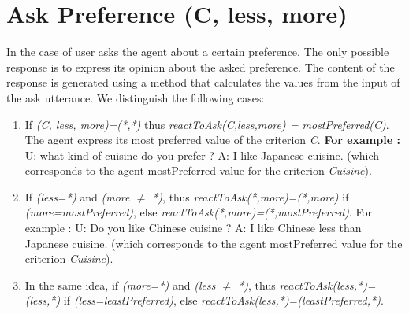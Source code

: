 \documentclass{llncs}
\begin{document}
\section{Ask Preference (C, less, more)}
	\par In the case of user asks the agent about a certain preference. The only possible response is to express its opinion about the asked preference.  The content of the response is generated using a method that calculates the values from the input of the ask utterance. We distinguish the following cases:
		\begin{enumerate}
			\item If \textit{(C, less, more)=(*,*)} thus \textit{reactToAsk(C,less,more) = mostPreferred(C)}. The agent express its most preferred value of the criterion \emph{C}.
				\subitem \textbf{For example :} 
				\subitem U: what kind of cuisine do you prefer ?
				\subitem A: I like Japanese cuisine. (which corresponds to the agent mostPreferred value for the criterion \textit{Cuisine}).
 
			\item  If \textit{(less=*)} and \textit{(more $\not =$ *)}, thus \textit{reactToAsk(*,more)=(*,more) } if \textit{(more=mostPreferred)}, else \textit{reactToAsk(*,more)=(*,mostPreferred)}.
			\subitem For example : 
				\subitem U: Do you like Chinese cuisine ?
				\subitem A: I like Chinese less than Japanese cuisine. (which corresponds to the agent mostPreferred value for the criterion \textit{Cuisine}).
			\item In the same idea, if \textit{(more=*)} and \textit{(less $\not =$ *)}, thus \textit{reactToAsk(less,*)=(less,*)} if \textit{(less=leastPreferred)}, else \textit{reactToAsk(less,*)=(leastPreferred,*)}.
			
		\end{enumerate}
\end{document}
